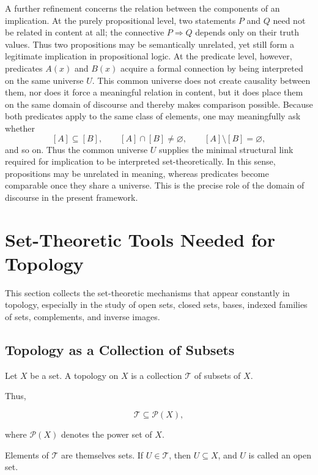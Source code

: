 \documentclass{article}
\begin{document}
	A further refinement concerns the relation between the components of an implication. At the purely propositional level, two statements \(P\) and \(Q\) need not be related in content at all; the connective \(P\Rightarrow Q\) depends only on their truth values. Thus two propositions may be semantically unrelated, yet still form a legitimate implication in propositional logic. At the predicate level, however, predicates \(A(x)\) and \(B(x)\) acquire a formal connection by being interpreted on the same universe \(U\). This common universe does not create causality between them, nor does it force a meaningful relation in content, but it does place them on the same domain of discourse and thereby makes comparison possible. Because both predicates apply to the same class of elements, one may meaningfully ask whether
	\[
	[A]\subseteq[B],
	\qquad
	[A]\cap[B]\neq\varnothing,
	\qquad
	[A]\setminus[B]=\varnothing,
	\]
	and so on. Thus the common universe \(U\) supplies the minimal structural link required for implication to be interpreted set-theoretically. In this sense, propositions may be unrelated in meaning, whereas predicates become comparable once they share a universe. This is the precise role of the domain of discourse in the present framework.
	
	\section{Set-Theoretic Tools Needed for Topology}
	
	This section collects the set-theoretic mechanisms that appear constantly in topology, especially in the study of open sets, closed sets, bases, indexed families of sets, complements, and inverse images.
	
	\subsection{Topology as a Collection of Subsets}
	
	Let \(X\) be a set. A topology on \(X\) is a collection \(\mathcal{T}\) of subsets of \(X\).
	
	Thus,
	
	$$
	\mathcal{T}\subseteq \mathcal{P}(X),
	$$
	
	where \(\mathcal{P}(X)\) denotes the power set of \(X\).
	
	Elements of \(\mathcal{T}\) are themselves sets. If \(U\in\mathcal{T}\), then \(U\subseteq X\), and \(U\) is called an open set.
	
\end{document}
